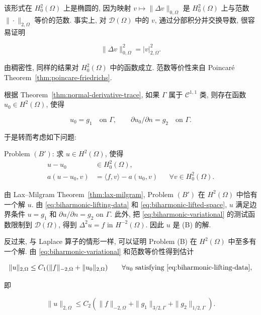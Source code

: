 该形式在 $H_0^2(\Omega)$ 上是椭圆的, 因为映射 $v\mapsto\|\Delta v\|_{0,\Omega}$ 是 $H_0^2(\Omega)$ 上与范数 $\|\cdot\|_{2,\Omega}$ 等价的范数. 事实上, 对 $\mathcal D(\Omega)$ 中的 $v$, 通过分部积分并交换导数, 很容易证明

\begin{equation}\label{eq:biharmonic-laplacian-norm}
\|\Delta v\|_{0,\Omega}^2=|v|_{2,\Omega}^2.
\end{equation}

由稠密性, 同样的结果对 $H_0^2(\Omega)$ 中的函数成立. 范数等价性来自
Poincaré Theorem~\ref{thm:poincare-friedrichs}.


根据 Theorem~\ref{thm:normal-derivative-trace}, 如果 $\Gamma$ 属于 $\mathcal C^{1,1}$ 类,
则存在函数 $u_0\in H^2(\Omega)$, 使得

\begin{equation}\label{eq:biharmonic-lifting-data}
u_0=g_1\quad\text{on }\Gamma,\qquad\partial u_0/\partial n=g_2\quad\text{on }\Gamma.
\end{equation}

于是转而考虑如下问题:

\noindent Problem $(B')$: 求 $u\in H^2(\Omega)$, 使得
\begin{align}
u-u_0&\in H_0^2(\Omega),\label{eq:biharmonic-lifted-space}\\
a(u-u_0,v)&=\langle f,v\rangle-a(u_0,v)
&&\forall v\in H_0^2(\Omega).\label{eq:biharmonic-variational}
\end{align}

由 Lax--Milgram Theorem~\ref{thm:lax-milgram}, Problem $(B')$ 在 $H^2(\Omega)$ 中恰有一个解 $u$.
由 \eqref{eq:biharmonic-lifting-data} 和 \eqref{eq:biharmonic-lifted-space}, $u$ 满足边界条件
$u=g_1$ 和 $\partial u/\partial n=g_2$ on $\Gamma$. 此外, 把
\eqref{eq:biharmonic-variational} 的测试函数限制到 $\mathcal D(\Omega)$, 得到
$\Delta^2u=f$ in $H^{-2}(\Omega)$. 因此 $u$ 是 (B) 的解.

反过来, 与 Laplace 算子的情形一样, 可以证明 Problem (B) 在 $H^2(\Omega)$ 中至多有一个解.
由 \eqref{eq:biharmonic-variational} 和范数等价性得到估计

\[
\|u\|_{2,\Omega}\leq C_1(\|f\|_{-2,\Omega}+\|u_0\|_{2,\Omega})
\qquad\forall u_0\text{ satisfying }\eqref{eq:biharmonic-lifting-data},
\]

即

\[
\|u\|_{2,\Omega}\leq C_2(\|f\|_{-2,\Omega}+\|g_1\|_{3/2,\Gamma}+\|g_2\|_{1/2,\Gamma}).
\]

